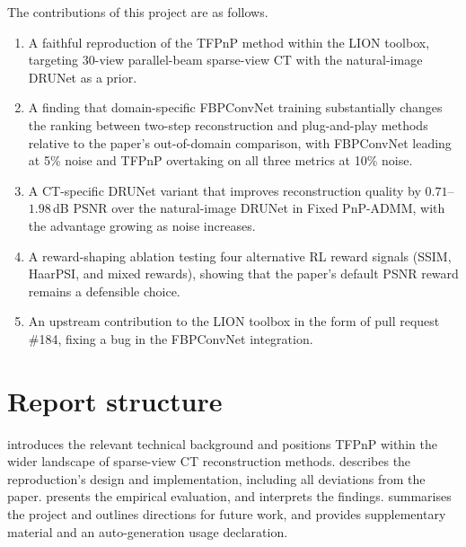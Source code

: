 The contributions of this project are as follows.
\begin{enumerate}[label=(\roman*)]
    \item A faithful reproduction of the TFPnP method within the LION toolbox, targeting 30-view parallel-beam          sparse-view CT with the natural-image DRUNet as a prior.
    \item A finding that domain-specific FBPConvNet training substantially changes the ranking between two-step
          reconstruction and plug-and-play methods relative to the paper's out-of-domain comparison, with FBPConvNet leading at 5\% noise and TFPnP overtaking on all three metrics at 10\% noise.
    \item A CT-specific DRUNet variant that improves reconstruction quality by $0.71$--$1.98$\,dB PSNR over the         natural-image DRUNet in Fixed PnP-ADMM, with the advantage growing as noise increases.
    \item A reward-shaping ablation testing four alternative RL reward signals (SSIM, HaarPSI, and mixed                rewards), showing that the paper's default PSNR reward remains a defensible choice.
    \item An upstream contribution to the LION toolbox in the form of pull request \#184, fixing a bug in the           FBPConvNet integration.
\end{enumerate}

\section{Report structure}
\label{sec:structure}

 introduces the relevant technical background and positions TFPnP within the wider landscape of sparse-view CT reconstruction methods.  describes the reproduction's design and implementation, including all deviations from the paper.  presents the empirical evaluation, and  interprets the findings.  summarises the project and outlines directions for future work, and  provides supplementary material and an auto-generation usage declaration.